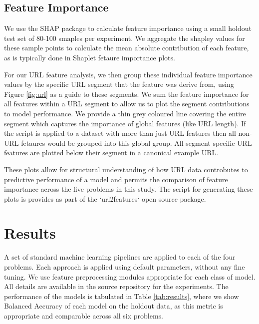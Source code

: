 \documentclass[sigconf]{acmart}
\begin{document}
\subsection{Feature Importance}

We use the SHAP\cite{Lundberg2017} package to calculate feature importance using a small holdout test set 
of 80-100 smaples per experiment. We aggregate the shapley values for these sample points to calculate the mean
absolute contribution of each feature, as is typically done in Shaplet fetaure importance plots.

For our URL feature analysis, we then group these individual feature importance values by the specific URL segment
that the feature was derive from, using Figure \ref{fig:url} as a guide to these segments. 
We sum the feature importance for all features within a URL segment to allow us to plot the
segment contributions to model performance. We provide a thin grey coloured line covering the entire segment
which captures the importance of global features (like URL length). If the script is applied to a dataset with
more than just URL features then all non-URL fetaures would be grouped into this global group. All segment specific
URL features are plotted below their segment in a canonical example URL.

These plots allow for structural understanding of how URL data
controbutes to predictive performance of a model and permits the comparison of feature importance 
across the five problems in this study. The script for generating these plots is provides as part of the
`url2features` open source package.

\section{Results}

A set of standard machine learning pipelines are applied to each of the four problems. Each approach is applied
using default parameters, without any fine tuning. We use feature preprocessing modules appropriate for each class
of model. All details are available in the source repository for the experiments. The performance of the models
is tabulated in Table \ref{tab:results}, where we show Balanced Accuracy of each model on the holdout data, as this
metric is appropriate and comparable across all six problems. 
\end{document}
